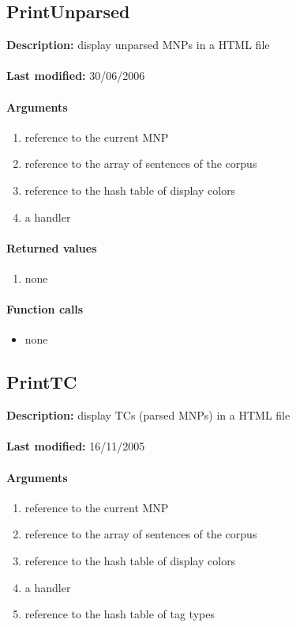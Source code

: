 \subsection{PrintUnparsed}
\textbf{Description:} display unparsed MNPs in a HTML file\\
\\\textbf{Last modified:} 30/06/2006

\paragraph{Arguments}
\begin{enumerate}
\item reference to the current MNP
\item reference to the array of sentences of the corpus
\item reference to the hash table of display colors
\item a handler
\end{enumerate}

\paragraph{Returned values}
\begin{enumerate}
\item none
\end{enumerate}

\paragraph{Function calls}
\begin{itemize}
\item none
\end{itemize}

\subsection{PrintTC}
\textbf{Description:} display TCs (parsed MNPs) in a HTML file\\
\\\textbf{Last modified:} 16/11/2005

\paragraph{Arguments}
\begin{enumerate}
\item reference to the current MNP
\item reference to the array of sentences of the corpus
\item reference to the hash table of display colors
\item a handler
\item reference to the hash table of tag types
\end{enumerate}

